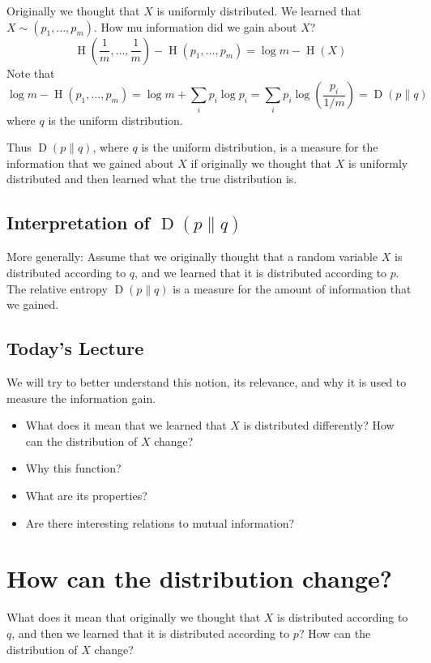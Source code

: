 \documentclass{article}
\begin{document}
Originally we thought that $X$ is uniformly distributed. We learned that $X\sim \left(p_1,\ldots,p_m\right)$. How mu information did we gain about $X$? 
\[
\operatorname{H}\left(\frac{1}{m},\ldots,\frac{1 }{m}\right) - \operatorname{H}\left(p_1,\ldots,p_m\right)=\log m -\operatorname{H}(X)
\]
Note that 
\[
\log m -\operatorname{H}\left(p_1,\ldots,p_m\right)= \log m + \sum_i p_i \log p_i = \sum_i p_i\log \left(\frac{p_i }{1/m}\right)=\operatorname{D}\left(p\| q\right)
\]
where $q$ is the uniform distribution.

Thus $\operatorname{D}\left(p\| q\right)$, where $q$ is the uniform distribution, is a measure for the information that we gained about $X$ if originally we thought that $X$ is uniformly distributed and then learned what the true distribution is.

\subsection{Interpretation of $\operatorname{D}\left(p\| q\right)$}

More generally: Assume that we originally thought that a random variable $X$ is distributed according to $q$, and we learned that it is distributed according to $p$. The relative entropy $\operatorname{D}\left(p\| q\right)$ is a measure for the amount of information that we gained.

\subsection{Today's Lecture}

We will try to better understand this notion, its relevance, and why it is used to measure the information gain.
\begin{itemize}
    \item What does it mean that we learned that $X$ is distributed differently? How can the distribution of $X$ change?
    \item Why this function?
    \item What are its properties?
    \item Are there interesting relations to mutual information?
\end{itemize}

\section{How can the distribution change?}

What does it mean that originally we thought that $X$ is distributed according to $q$, and then we learned that it is distributed according to $p$? How can the distribution of $X$ change?
\end{document}
